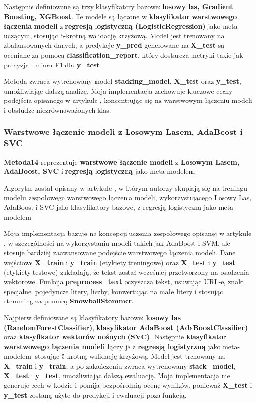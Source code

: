 Następnie definiowane są trzy klasyfikatory bazowe: \textbf{losowy las, Gradient Boosting, XGBoost}. Te modele są łączone w \textbf{klasyfikator warstwowego łączenia modeli} z \textbf{regresją logistyczną (LogisticRegression)} jako meta-uczącym, stosując 5-krotną walidację krzyżową. Model jest trenowany na zbalansowanych danych, a predykcje \textbf{y\_pred} generowane na \textbf{X\_test} są oceniane za pomocą \textbf{classification\_report}, który dostarcza metryki takie jak precyzja i miara F1 dla \textbf{y\_test}.

Metoda zwraca wytrenowany model \textbf{stacking\_model}, \textbf{X\_test} oraz \textbf{y\_test}, umożliwiając dalszą analizę. Moja implementacja zachowuje kluczowe cechy podejścia opisanego w artykule \cite{metoda13}, koncentrując się na warstwowym łączeniu modeli i obsłudze niezrównoważonych klas.

\subsubsection{Warstwowe łączenie modeli z Losowym Lasem, AdaBoost i SVC}
\textbf{Metoda14} reprezentuje \textbf{warstwowe łączenie modeli} z \textbf{Losowym Lasem, AdaBoost, SVC} i \textbf{regresją logistyczną} jako meta-modelem.

Algorytm został opisany w artykule \cite{metoda14}, w którym autorzy skupiają się na treningu modelu zespołowego warstwowego łączenia modeli, wykorzystującego Losowy Las, AdaBoost i SVC jako klasyfikatory bazowe, z regresją logistyczną jako meta-modelem.

Moja implementacja bazuje na koncepcji uczenia zespołowego opisanej w artykule \cite{metoda14}, w szczególności na wykorzystaniu modeli takich jak AdaBoost i SVM, ale stosuje bardziej zaawansowane podejście warstwowego łączenia modeli. Dane wejściowe \textbf{X\_train} i \textbf{y\_train} (etykiety treningowe) oraz \textbf{X\_test} i \textbf{y\_test} (etykiety testowe) zakładają, że tekst został wcześniej przetworzony na osadzenia wektorowe. Funkcja \textbf{preprocess\_text} oczyszcza tekst, usuwając URL-e, znaki specjalne, pojedyncze litery, liczby, konwertując na małe litery i stosując stemming za pomocą \textbf{SnowballStemmer}.

Najpierw definiowane są klasyfikatory bazowe: \textbf{losowy las (RandomForestClassifier)}, \textbf{klasyfikator AdaBoost (AdaBoostClassifier)} oraz \textbf{klasyfikator wektorów nośnych (SVC)}. Następnie \textbf{klasyfikator warstwowego łączenia modeli} łączy je z \textbf{regresją logistyczną} jako meta-modelem, stosując 5-krotną walidację krzyżową. Model jest trenowany na \textbf{X\_train} i \textbf{y\_train}, a po zakończeniu zwraca wytrenowany \textbf{stack\_model}, \textbf{X\_test} i \textbf{y\_test}, umożliwiając dalszą ewaluację. Moja implementacja nie generuje cech w kodzie i pomija bezpośrednią ocenę wyników, ponieważ \textbf{X\_test} i \textbf{y\_test} zostaną użyte do predykcji i ewaluacji poza funkcją.

